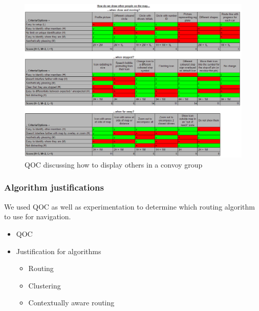 \documentclass{article}
\begin{document}
\begin{figure}[H]
  \centering
  \includegraphics[scale=0.5]{qoc-convoy}
  \caption{QOC discussing how to display others in a convoy group}\label{qoc-convoy}
\end{figure}

\subsubsection{Algorithm justifications}\label{sssec:nav-design-alg}
We used QOC as well as experimentation to determine which routing algorithm to use for navigation.


\begin{itemize}
  \item QOC %
  \item Justification for algorithms
    \begin{itemize}
      \item Routing
      \item Clustering
      \item Contextually aware routing
    \end{itemize}
\end{itemize}
\end{document}

